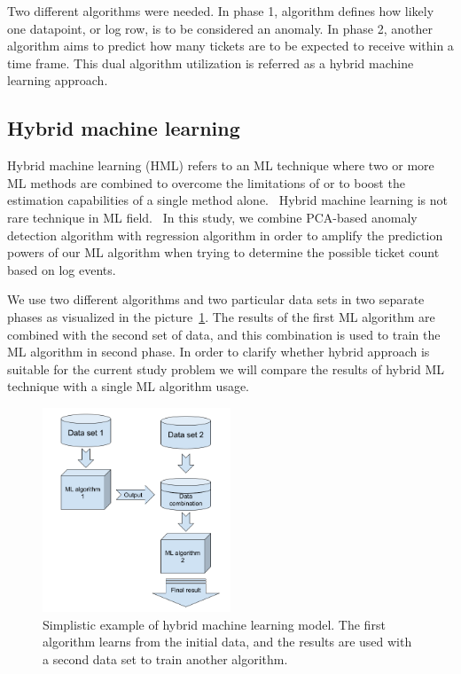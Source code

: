 Two different algorithms were needed.
In phase 1,
algorithm defines how likely one datapoint, or log row,
is to be considered an anomaly.
In phase 2,
another algorithm aims to predict
how many tickets are to be expected to receive
within a time frame.
This dual algorithm utilization is referred as a hybrid machine learning approach.~\cite{tsai2010credit}




\subsection{Hybrid machine learning}\label{subsec:pipe-hybrid-ml}

Hybrid machine learning (HML)
refers to an ML technique
where two or more ML methods are combined
to overcome the limitations of
or to boost the estimation capabilities of
a single method alone.~\cite{Anifowose2020hml}
Hybrid machine learning is not rare technique in ML field.~\cite{shon2007hybrid,tsai2010credit,mohan2019effective,
    hsieh2005hybrid,jain2007hybrid,kim2007hybrid,lee2002credit,malhotra2002differentiating}
In this study,
we combine PCA-based anomaly detection algorithm
with regression algorithm
in order to amplify the prediction powers of our ML algorithm
when trying to determine the possible ticket count
based on log events.

We use two different algorithms and two particular data sets
in two separate phases as visualized in the picture~\ref{fig:hybrid-ml-model}.
The results of the first ML algorithm are combined
with the second set of data,
and this combination is used to train the ML algorithm in second phase.
In order to clarify whether hybrid approach is suitable for the current study problem
we will compare the results of hybrid ML technique
with a single ML algorithm usage.

\begin{figure}[htb]
    \centering
    \includegraphics[width=0.5\textwidth,]{./appendices/hybrid-ml-model}
    \caption{Simplistic example of hybrid machine learning model.
    The first algorithm learns from the initial data,
        and the results are used with a second data set to train another algorithm.
        \label{fig:hybrid-ml-model}}
\end{figure}


